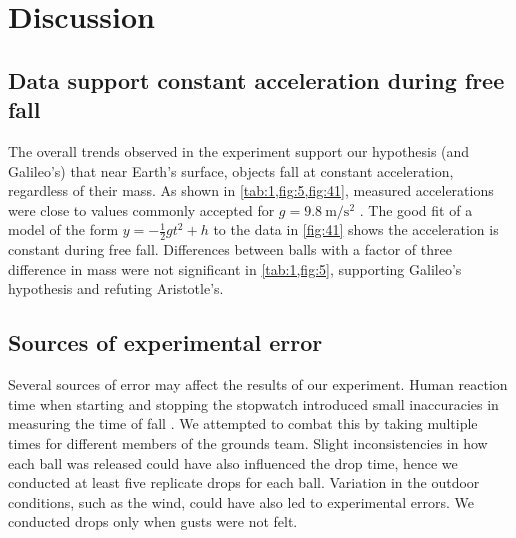 \documentclass[reprint,amsmath,amssymb,aps,twoside]{revtex4-2}
\begin{document}
\section{Discussion}

\subsection{Data support constant acceleration during free fall}
The overall trends observed in the experiment support our hypothesis (and Galileo's) that near Earth's surface, objects fall at constant acceleration, regardless of their mass. As shown in \cref{tab:1,fig:5,fig:41}, measured accelerations were close to values commonly accepted for $g=\qty{9.8}{\meter\per\second\squared}$ \cite{tipler,openstax,barrons}. The good fit of a model of the form $y=-\frac{1}{2}gt^2+h$ to the data in \cref{fig:41} shows the acceleration is constant during free fall. Differences between balls with a factor of three difference in mass were not significant in \cref{tab:1,fig:5}, supporting Galileo's hypothesis and refuting Aristotle's. 



\subsection{Sources of experimental error}
Several sources of error may affect the results of our experiment. Human reaction time when starting and stopping the stopwatch introduced small inaccuracies in measuring the time of fall \cite{hetzler:2008:reliability,faux:2019:manual}. We attempted to combat this by taking multiple times for different members of the grounds team. Slight inconsistencies in how each ball was released could have also influenced the drop time, hence we conducted at least five replicate drops for each ball. Variation in the outdoor conditions, such as the wind, could have also led to experimental errors. We conducted drops only when gusts were not felt. 
\end{document}
